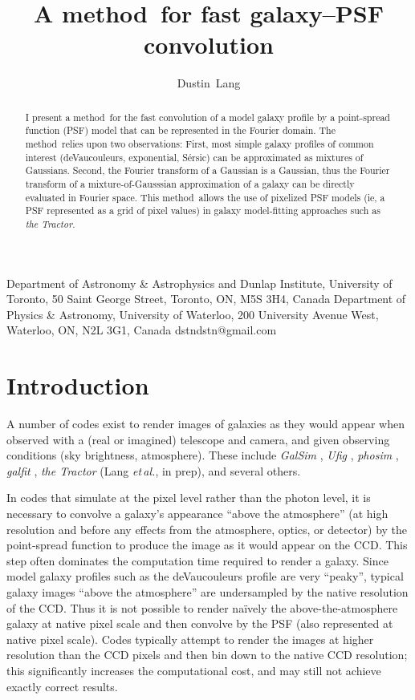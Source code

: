 \documentclass[11pt,preprint]{aastex}
\newcommand{\foreign}[1]{\emph{#1}}
\newcommand{\etal}{\foreign{et\,al.}}
\newcommand{\project}[1]{\textsl{#1}}
\newcommand{\trick}{method}
\begin{document}
\title{A \trick\ for fast galaxy--PSF convolution}
\author{Dustin~Lang}
%
{Department of Astronomy \& Astrophysics and Dunlap Institute,
  University of Toronto,
  50 Saint George Street, Toronto, ON, M5S 3H4, Canada}
%
{Department of Physics \& Astronomy,
  University of Waterloo,
  200 University Avenue West,
  Waterloo, ON, N2L 3G1, Canada}
%
{dstndstn@gmail.com}
\date{}

\begin{abstract}
  I present a \trick\ for the fast convolution of a model galaxy profile
  by a point-spread function (PSF) model that can be represented in
  the Fourier domain.  The \trick\ relies upon two observations: First, most
  simple galaxy profiles of common interest (deVaucouleurs,
  exponential, S\'ersic) can be approximated as mixtures of Gaussians.
  Second, the Fourier transform of a Gaussian is a Gaussian, thus the
  Fourier transform of a mixture-of-Gausssian approximation of a
  galaxy can be directly evaluated in Fourier space.  This \trick\ 
  allows the use of pixelized PSF models (ie, a PSF represented as a
  grid of pixel values) in galaxy model-fitting approaches such as
  \project{the Tractor}.
\end{abstract}

\section{Introduction}

A number of codes exist to render images of galaxies as they would
appear when observed with a (real or imagined) telescope and camera,
and given observing conditions (sky brightness, atmosphere).  These
include \project{GalSim} \citep{galsim}, \project{Ufig} \citep{ufig},
\project{phosim} \citep{phosim}, \project{galfit} \citep{galfit}, 
\project{the Tractor} (Lang \etal, in prep), and several others.


In codes that simulate at the pixel level rather than the photon
level, it is necessary to convolve a galaxy's appearance ``above the
atmosphere'' (at high resolution and before any effects from the
atmosphere, optics, or detector) by the point-spread function to
produce the image as it would appear on the CCD.  This step often
dominates the computation time required to render a galaxy.  Since
model galaxy profiles such as the deVaucouleurs profile are very
``peaky'', typical galaxy images ``above the atmosphere'' are
undersampled by the native resolution of the CCD.  Thus it is not
possible to render na\"ively the above-the-atmosphere galaxy at native
pixel scale and then convolve by the PSF (also represented at native
pixel scale).  Codes typically attempt to render the images at higher
resolution than the CCD pixels and then bin down to the native CCD
resolution; this significantly increases the computational cost, and
may still not achieve exactly correct results.
\end{document}
